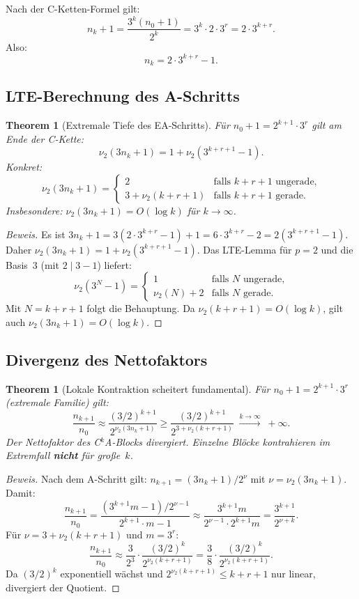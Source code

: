 \documentclass[12pt,a4paper]{article}
\newtheorem{theorem}[definition]{Theorem}
\newenvironment{beweis}{\begin{proof}[Beweis]}{\end{proof}}
\newcommand{\vii}{\nu_2}
\begin{document}
Nach der C-Ketten-Formel gilt:
\[
  n_k + 1 = \frac{3^k(n_0+1)}{2^k} = 3^k \cdot 2 \cdot 3^r = 2\cdot 3^{k+r}.
\]
Also:
\[
  n_k = 2\cdot 3^{k+r} - 1.
\]

\subsection{LTE-Berechnung des A-Schritts}

\begin{theorem}[Extremale Tiefe des EA-Schritts]
\label{thm:lte-extrem}
Für $n_0+1 = 2^{k+1}\cdot 3^r$ gilt am Ende der C-Kette:
\[
  \vii(3n_k + 1) = 1 + \vii(3^{k+r+1} - 1).
\]
Konkret:
\[
  \vii(3n_k+1) =
  \begin{cases}
    2 & \text{falls $k+r+1$ ungerade,}\\
    3 + \vii(k+r+1) & \text{falls $k+r+1$ gerade.}
  \end{cases}
\]
Insbesondere: $\vii(3n_k+1) = O(\log k)$ für $k \to \infty$.
\end{theorem}

\begin{beweis}
Es ist $3n_k + 1 = 3(2\cdot 3^{k+r}-1)+1 = 6\cdot 3^{k+r} - 2 = 2(3^{k+r+1}-1)$.
Daher $\vii(3n_k+1) = 1 + \vii(3^{k+r+1}-1)$.
Das LTE-Lemma für $p=2$ und die Basis~$3$ (mit $2 \mid 3-1$) liefert:
\[
  \vii(3^N - 1) =
  \begin{cases}
    1 & \text{falls $N$ ungerade,}\\
    \vii(N) + 2 & \text{falls $N$ gerade.}
  \end{cases}
\]
Mit $N = k+r+1$ folgt die Behauptung. Da $\vii(k+r+1) = O(\log k)$, gilt
auch $\vii(3n_k+1) = O(\log k)$.
\end{beweis}

\subsection{Divergenz des Nettofaktors}

\begin{theorem}[Lokale Kontraktion scheitert fundamental]
\label{thm:kein-einzelblock}
Für $n_0 + 1 = 2^{k+1}\cdot 3^r$ (extremale Familie) gilt:
\[
  \frac{n_{k+1}}{n_0}
  \approx \frac{(3/2)^{k+1}}{2^{\vii(3n_k+1)}}
  \geq \frac{(3/2)^{k+1}}{2^{3+\vii(k+r+1)}}
  \;\xrightarrow{k\to\infty}\; +\infty.
\]
Der Nettofaktor des C$^k$A-Blocks divergiert. Einzelne Blöcke kontrahieren
im Extremfall \textbf{nicht} für große~$k$.
\end{theorem}

\begin{beweis}
Nach dem A-Schritt gilt:
$n_{k+1} = (3n_k+1)/2^{\nu}$ mit $\nu = \vii(3n_k+1)$.
Damit:
\[
  \frac{n_{k+1}}{n_0}
  = \frac{(3^{k+1}m-1)/2^{\nu-1}}{2^{k+1}\cdot m - 1}
  \approx \frac{3^{k+1}m}{2^{\nu-1} \cdot 2^{k+1} m}
  = \frac{3^{k+1}}{2^{\nu+k}}.
\]
Für $\nu = 3 + \vii(k+r+1)$ und $m = 3^r$:
\[
  \frac{n_{k+1}}{n_0}
  \approx \frac{3}{2^3} \cdot \frac{(3/2)^k}{2^{\vii(k+r+1)}}
  = \frac{3}{8} \cdot \frac{(3/2)^k}{2^{\vii(k+r+1)}}.
\]
Da $(3/2)^k$ exponentiell wächst und $2^{\vii(k+r+1)} \leq k+r+1$ nur
linear, divergiert der Quotient.
\end{beweis}
\end{document}
